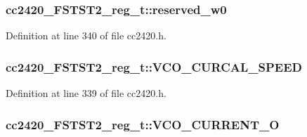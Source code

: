\subsubsection[{\texorpdfstring{reserved\+\_\+w0}{reserved_w0}}]{ cc2420\+\_\+\+F\+S\+T\+S\+T2\+\_\+reg\+\_\+t\+::reserved\+\_\+w0}\hypertarget{structcc2420___f_s_t_s_t2__reg__t_aa7c3d845016926bb484ce1ec82fb2606}{}\label{structcc2420___f_s_t_s_t2__reg__t_aa7c3d845016926bb484ce1ec82fb2606}


Definition at line 340 of file cc2420.\+h.

\subsubsection[{\texorpdfstring{V\+C\+O\+\_\+\+C\+U\+R\+C\+A\+L\+\_\+\+S\+P\+E\+ED}{VCO_CURCAL_SPEED}}]{ cc2420\+\_\+\+F\+S\+T\+S\+T2\+\_\+reg\+\_\+t\+::\+V\+C\+O\+\_\+\+C\+U\+R\+C\+A\+L\+\_\+\+S\+P\+E\+ED}\hypertarget{structcc2420___f_s_t_s_t2__reg__t_a780bc8bdf7b9d04f57eb1aebc17cfccc}{}\label{structcc2420___f_s_t_s_t2__reg__t_a780bc8bdf7b9d04f57eb1aebc17cfccc}


Definition at line 339 of file cc2420.\+h.

\subsubsection[{\texorpdfstring{V\+C\+O\+\_\+\+C\+U\+R\+R\+E\+N\+T\+\_\+O}{VCO_CURRENT_O}}]{ cc2420\+\_\+\+F\+S\+T\+S\+T2\+\_\+reg\+\_\+t\+::\+V\+C\+O\+\_\+\+C\+U\+R\+R\+E\+N\+T\+\_\+O}\hypertarget{structcc2420___f_s_t_s_t2__reg__t_a6bcd5bb3583c782f5de9374309610cbc}{}\label{structcc2420___f_s_t_s_t2__reg__t_a6bcd5bb3583c782f5de9374309610cbc}


